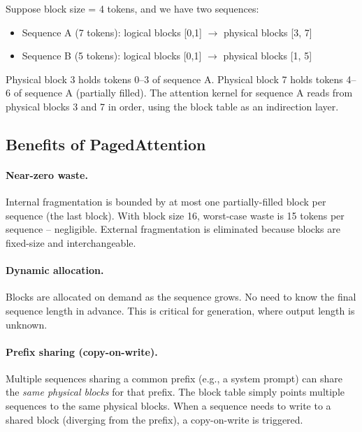 \begin{examplebox}
Suppose block size = 4 tokens, and we have two sequences:

\begin{itemize}
  \item Sequence A (7 tokens): logical blocks [0,1] $\to$ physical blocks [3, 7]
  \item Sequence B (5 tokens): logical blocks [0,1] $\to$ physical blocks [1, 5]
\end{itemize}

Physical block 3 holds tokens 0--3 of sequence A. Physical block 7 holds tokens 4--6 of sequence A (partially filled). The attention kernel for sequence A reads from physical blocks 3 and 7 in order, using the block table as an indirection layer.
\end{examplebox}

\subsection{Benefits of PagedAttention}
\label{benefits-of-pagedattention}

\paragraph{Near-zero waste.}
\label{near-zero-waste.}

Internal fragmentation is bounded by at most one partially-filled block per sequence (the last block). With block size 16, worst-case waste is 15 tokens per sequence -- negligible. External fragmentation is eliminated because blocks are fixed-size and interchangeable.

\paragraph{Dynamic allocation.}
\label{dynamic-allocation.}

Blocks are allocated on demand as the sequence grows. No need to know the final sequence length in advance. This is critical for generation, where output length is unknown.

\paragraph{Prefix sharing (copy-on-write).}
\label{prefix-sharing-copy-on-write.}

Multiple sequences sharing a common prefix (e.g., a system prompt) can share the \emph{same physical blocks} for that prefix. The block table simply points multiple sequences to the same physical blocks. When a sequence needs to write to a shared block (diverging from the prefix), a copy-on-write is triggered.

